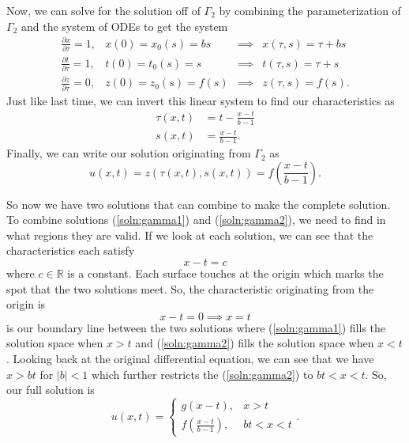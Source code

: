 \documentclass[a4paper,12pt]{article}
\newcommand{\reals}{\mathbb{R}}
\newcommand{\abs}[1]{\left| #1 \right|}
\begin{document}
\begin{enumerate}[label = \textbf{(\alph*)}]
        Now, we can solve for the solution off of $ \Gamma_2 $ by combining the parameterization of $ \Gamma_2 $ and the system of ODEs to get the system
        \[
            \begin{array}{rccl}
                \frac{\partial x}{\partial \tau} = 1, & x(0) = x_0(s) = bs & \implies & x(\tau, s) = \tau + bs \\
                \frac{\partial t}{\partial \tau} = 1, & t(0) = t_0(s) = s & \implies & t(\tau, s) = \tau + s\\
                \frac{\partial z}{\partial \tau} = 0, & z(0) = z_0(s) = f(s) & \implies & z(\tau, s) = f(s).
            \end{array}
        \]
        Just like last time, we can invert this linear system to find our characteristics as
        \begin{align*}
            \tau(x,t) &= t - \frac{x - t}{b - 1} \\
            s(x,t) &= \frac{x - t}{b - 1}.
        \end{align*}
        Finally, we can write our solution originating from $ \Gamma_2 $ as
        \begin{equation}
            u(x,t) = z(\tau(x,t), s(x,t)) = f(\frac{x - t}{b - 1}). \label{soln:gamma2}
        \end{equation}
    
        So now we have two solutions that can combine to make the complete solution. To combine solutions (\ref{soln:gamma1}) and (\ref{soln:gamma2}), we need to find in what regions they are valid. If we look at each solution, we can see that the characteristics each satisfy
        \[
            x - t = c
        \]
        where $ c \in \reals $ is a constant. Each surface touches at the origin which marks the spot that the two solutions meet. So, the characteristic originating from the origin is
        \[
            x - t = 0 \implies x = t
        \]
        is our boundary line between the two solutions where (\ref{soln:gamma1}) fills the solution space when $ x > t $ and (\ref{soln:gamma2}) fills the solution space when $ x < t $. Looking back at the original differential equation, we can see that we have $ x > bt $ for $ \abs{b} < 1 $ which further restricts the (\ref{soln:gamma2}) to $ bt < x < t $. So, our full solution is
        \begin{equation}
            u(x,t) = 
                \begin{cases}
                    g(x - t), & x > t \\
                    f(\frac{x - t}{b - 1}), & bt < x < t
                \end{cases}. \label{soln:full}
        \end{equation}
    

\end{enumerate}
\end{document}
